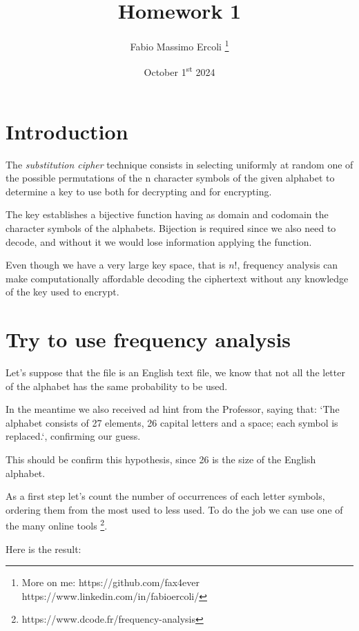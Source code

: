 \documentclass{article}
\title{Homework 1}
\author{Fabio Massimo Ercoli
		\footnote{
			More on me:
			https://github.com/fax4ever
			https://www.linkedin.com/in/fabioercoli/
			}}
\date{October 1\textsuperscript{st} 2024}
\begin{document}
	
\maketitle
\thispagestyle{empty}

\section{Introduction}

The  \emph{substitution cipher} technique consists in selecting uniformly at random one of the possible permutations of the n character symbols of the given alphabet to determine a key to use both for decrypting and for encrypting. 

The key establishes a bijective function having as domain and codomain the character symbols of the alphabets. Bijection is required since we also need to decode, and without it we would lose information applying the function.

Even though we have a very large key space, that is $n!$, frequency analysis can make computationally affordable decoding the ciphertext without any knowledge of the key used to encrypt.

\section{Try to use frequency analysis}
	
Let's suppose that the file is an English text file, we know that not all the letter of the alphabet has the same probability to be used.

In the meantime we also received ad hint from the Professor, saying that: `The alphabet consists of 27 elements, 26 capital letters and a space; each symbol is replaced.`, confirming our guess.

This should be confirm this hypothesis, since 26 is the size of the English alphabet.

As a first step let's count the number of occurrences of each letter symbols, ordering them from the most used to less used. To do the job we can use one of the many online tools
	\footnote{https://www.dcode.fr/frequency-analysis}.
	
Here is the result:
\end{document}
